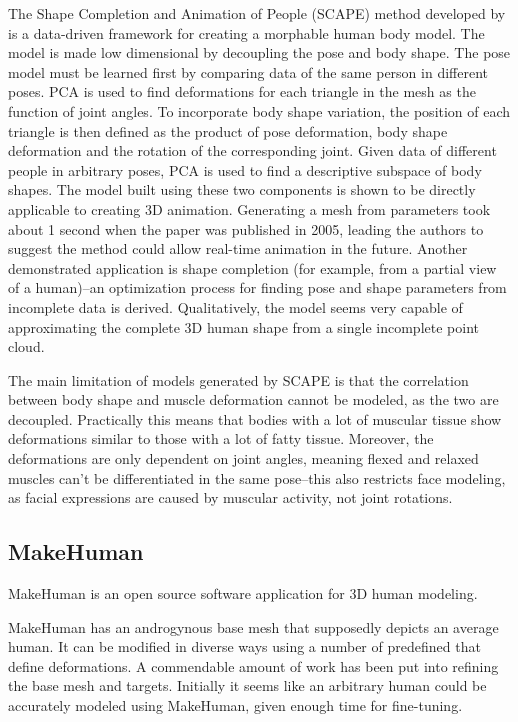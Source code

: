 The Shape Completion and Animation of People (SCAPE) method developed by \citet{anguelov2005scape} is a data-driven framework for creating a morphable human body model. The model is made low dimensional by decoupling the pose and body shape. The pose model must be learned first by comparing data of the same person in different poses. PCA is used to find deformations for each triangle in the mesh as the function of joint angles. To incorporate body shape variation, the position of each triangle is then defined as the product of pose deformation, body shape deformation and the rotation of the corresponding joint. Given data of different people in arbitrary poses, PCA is used to find a descriptive subspace of body shapes. The model built using these two components is shown to be directly applicable to creating 3D animation. Generating a mesh from parameters took about 1 second when the paper was published in 2005, leading the authors to suggest the method could allow real-time animation in the future. Another demonstrated application is shape completion (for example, from a partial view of a human)--an optimization process for finding pose and shape parameters from incomplete data is derived. Qualitatively, the model seems very capable of approximating the complete 3D human shape from a single incomplete point cloud.

The main limitation of models generated by SCAPE is that the correlation between body shape and muscle deformation cannot be modeled, as the two are decoupled. Practically this means that bodies with a lot of muscular tissue show deformations similar to those with a lot of fatty tissue. Moreover, the deformations are only dependent on joint angles, meaning flexed and relaxed muscles can't be differentiated in the same pose--this also restricts face modeling, as facial expressions are caused by muscular activity, not joint rotations. \citep{anguelov2005scape}



\subsection{MakeHuman} \label{literature.makehuman}

MakeHuman \citep{makehuman} is an open source software application for 3D human modeling.

MakeHuman has an androgynous base mesh that supposedly depicts an average human. It can be modified in diverse ways using a number of predefined  that define deformations. A commendable amount of work has been put into refining the base mesh and targets. Initially it seems like an arbitrary human could be accurately modeled using MakeHuman, given enough time for fine-tuning.

